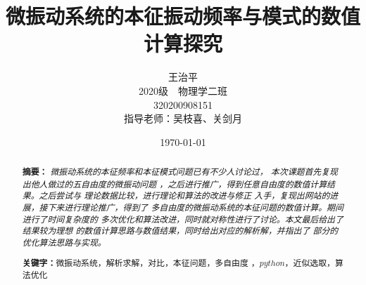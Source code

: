 \documentclass[11pt, a4paper, oneside]{ctexart}
\title{\textbf{微振动系统的本征振动频率与模式的数值计算探究
}}
\author{{王治平} 
\\\vspace{-6mm}
\small{2020级\ \ 物理学二班}
\\\small{320200908151}
\\{指导老师：吴枝喜、关剑月}}
\date{\today}
\begin{document}
\maketitle
	

    \maketitle

    \setcounter{page}{0}
    \maketitle
    \thispagestyle{empty}
    ~\\~\\~\\

\maketitle

\setcounter{page}{0}
\maketitle
\thispagestyle{empty}

\begin{abstract}
    {\setlength{\parindent}{0em}\textbf{摘要：}\emph{
    微振动系统的本征频率和本征模式问题已有不少人讨论过，
    本次课题首先复现出他人做过的五自由度的微振动问题
    ，之后进行推广，得到任意自由度的数值计算结果。之后尝试与
    理论数据比较，进行理论和算法的改进与修正
    入手，复现出网站的进展，接下来进行理论推广，得到了
    多自由度的微振动系统的本征问题的数值计算。期间进行了时间复杂度的
    多次优化和算法改进，同时就对称性进行了讨论。本文最后给出了结果较为理想
    的数值计算思路与数值结果，同时给出对应的解析解，并指出了
    部分的优化算法思路与实现。
    }


    }
    \vspace{6mm}
    \setlength{\parindent}{2em}\textbf{关键字：}{微振动系统，解析求解，对比，本征问题，多自由度
    ，$python$，近似选取，算法优化}
\end{abstract}
\end{document}

